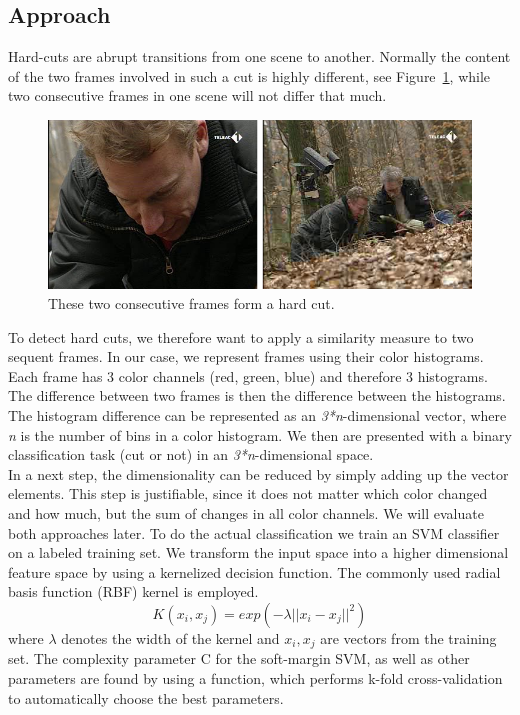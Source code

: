 \subsection{Approach}
\label{sec:hard_cut_approach}

Hard-cuts are abrupt transitions from one scene to another. 
Normally the content of the two frames involved in such a cut is highly different, see Figure~\ref{fig:hard_cut_example}, while two consecutive frames in one scene will not differ that much. 

\begin{figure}
	\centering
	\includegraphics[scale=.7]{images/hard_cut_example.png}
	\caption{These two consecutive frames form a hard cut.}
	\label{fig:hard_cut_example}
\end{figure}

To detect hard cuts, we therefore want to apply a similarity measure to two sequent frames. 
In our case, we represent frames using their color histograms. 
Each frame has 3 color channels (red, green, blue) and therefore 3 histograms.
The difference between two frames is then the difference between the histograms.
The histogram difference can be represented as an \emph{3*n}-dimensional vector, where \emph{n} is the number of bins in a color histogram. 
We then are presented with a binary classification task (cut or not) in an \emph{3*n}-dimensional space. \\
In a next step, the dimensionality can be reduced by simply adding up the vector elements. 
This step is justifiable, since it does not matter which color changed and how much, but the sum of changes in all color channels. 
We will evaluate both approaches later.
To do the actual classification we train an SVM classifier on a labeled training set.
We transform the input space into a higher dimensional feature space by using a kernelized decision function. The commonly used radial basis function (RBF) kernel is employed. 
$$K(x_i,x_j) = exp(-\lambda || x_i - x_j ||^2)$$ 
where $\lambda$ denotes the width of the kernel and $x_i, x_j $ are vectors from the training set. The complexity parameter C for the soft-margin SVM, as well as other parameters are found by using a function, which performs k-fold cross-validation to automatically choose the best parameters.


